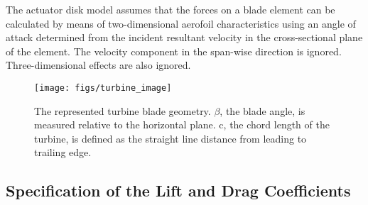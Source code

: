 The actuator disk model assumes that the forces on a blade
element can be calculated by means of two-dimensional aerofoil
characteristics using an angle of attack determined from the incident
resultant velocity in the cross-sectional plane of the element. The
velocity component in the span-wise direction is
ignored. Three-dimensional effects are also
ignored\cite{burton2001wind}.  

  \begin{figure}[!htb]
    \begin{center}
     \texttt{[image: figs/turbine\_image]}
     \caption{The represented turbine blade
     geometry. $\beta$, the blade angle, is measured relative to the
     horizontal plane. c, the chord length of the turbine, is defined as
     the straight line distance from leading to trailing edge. } 
     \label{fig:turbine_image}
    \end{center}
  \end{figure}

\subsection{Specification of the Lift and Drag Coefficients}

